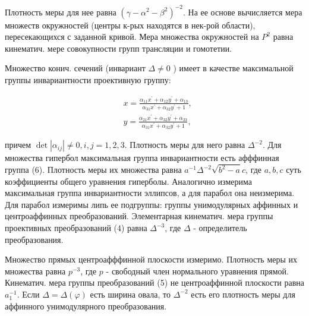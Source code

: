 \documentclass[10pt]{article}
\begin{document}
Плотность меры для нее равна $\left(\gamma-\alpha^{2}-\beta^{2}\right)^{-2}$. На ее основе вычисляется мера множеств окружностей (центры к-рых находятся в нек-рой области), пересекающихся с заданной кривой. Мера множества окружностей на $P^{2}$ равна кинематич. мере совокупности групп трансляции и гомотетии.



Множество конич. сечений (инвариант $\Delta \neq 0$ ) имеет в качестве максимальной группы инвариантности проективную группу:



\[

\begin{aligned}

& x=\frac{\alpha_{11} x^{\prime}+\alpha_{12} y^{\prime}+\alpha_{13}}{\alpha_{31} x^{\prime}+\alpha_{32} y^{\prime}+1}, \\

& y=\frac{\alpha_{21} x^{\prime}+\alpha_{32} y^{\prime}+\alpha_{23}}{\alpha_{31} x^{\prime}+\alpha_{32} y^{\prime}+1},

\end{aligned}

\]



причем $\operatorname{det}\left|\alpha_{i j}\right| \neq 0, i, j=1,2,3$. Плотность меры для него равна $\Delta^{-2}$. Для множества гипербол максимальная группа инвариантности есть афффинная группа (6). Плотность меры их множества равна $a^{-1} \Delta^{-2} \sqrt{b^{2}-a} c$, где $a, b, c$ суть коэффициенты общего уравнения гиперболы. Аналогично измерима максимальная группа инвариантности эллипсов, а для парабол она неизмерима. Для парабол измеримы липь ее подгруппы: группы унимодулярных аффинных и центроаффинных преобразований. Элементарная кинематич. мера группы проективных преобразований (4) равна $\Delta^{-3}$, где $\Delta$ - определитель преобразования.



Множество прямых центроафффинной плоскости измеримо. Плотность меры их множества равна $p^{-3}$, где $p$ - свободный член нормального уравнения прямой. Кинематич. мера группы преобразований (5) не центроаффинной плоскости равна $a_{1}^{-1}$. Если $\Delta=\Delta(\varphi)$ есть ширина овала, то $\Delta^{-2}$ есть его плотность меры для аффинного унимодулярного преобразования.
\end{document}
